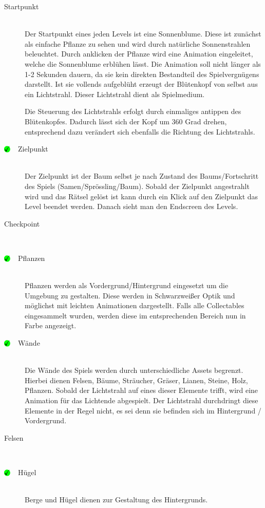 \begin{description}
\item [Startpunkt] \hfill \\
Der Startpunkt eines jeden Levels ist eine Sonnenblume. Diese ist zunächst als einfache Pflanze zu sehen und wird durch natürliche Sonnenstrahlen beleuchtet. Durch anklicken der Pflanze wird eine Animation eingeleitet, welche die Sonnenblume erblühen lässt. Die Animation soll nicht länger als 1-2 Sekunden dauern, da sie kein direkten Bestandteil des Spielvergnügens darstellt. Ist sie vollends aufgeblüht erzeugt der Blütenkopf von selbst aus ein Lichtstrahl. Dieser Lichtstrahl dient als Spielmedium. 

Die Steuerung des Lichtstrahls erfolgt durch einmaliges antippen des Blütenkopfes. Dadurch lässt sich der Kopf um 360 Grad drehen, entsprechend dazu verändert sich ebenfalls die Richtung des Lichtstrahls.

\item [$\circledmark\quad$Zielpunkt] \hfill \\
Der Zielpunkt ist der Baum  selbst je nach Zustand des Baums/Fortschritt des Spiels (Samen/Sprössling/Baum). 
Sobald der Zielpunkt angestrahlt wird und das Rätsel gelöst ist kann durch ein Klick auf den Zielpunkt das Level beendet werden. Danach sieht man den Endscreen des Levels.
\item [Checkpoint]\hfill \\

\item [$\circledmark\quad$Pflanzen] \hfill \\
Pflanzen werden als Vordergrund/Hintergrund eingesetzt um die Umgebung zu gestalten. Diese werden in Schwarzweißer Optik und möglichst mit leichten Animationen dargestellt. Falls alle Collectables eingesammelt wurden, werden diese im entsprechenden Bereich nun in Farbe angezeigt.

\item [$\circledmark\quad$Wände] \hfill \\
Die Wände des Spiels werden durch unterschiedliche Assets begrenzt. Hierbei dienen Felsen, Bäume, Sträucher, Gräser, Lianen, Steine, Holz, Pflanzen. Sobald der Lichtstrahl auf eines dieser Elemente trifft, wird eine Animation für das Lichtende abgespielt. Der Lichtstrahl durchdringt diese Elemente in der Regel nicht, es sei denn sie befinden sich im Hintergrund / Vordergrund.

\item [Felsen]\hfill \\

\item [$\circledmark\quad$Hügel] \hfill \\
Berge und Hügel dienen zur Gestaltung des Hintergrunds.


\end{description}
